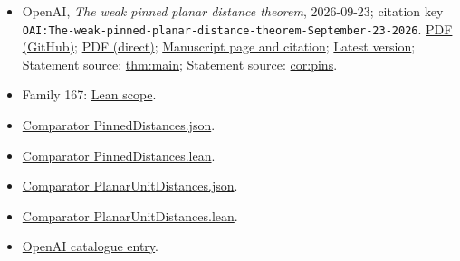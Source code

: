 \documentclass[11pt]{article}
\begin{document}
\begin{itemize}
\item OpenAI, \emph{The weak pinned planar distance theorem}, 2026-09-23; citation key \texttt{OAI:The-weak-pinned-planar-distance-theorem-September-23-2026}. \href{https://github.com/openai/math/blob/adc7f1241b42e322a6451854ab7e4b4c146bf78a/preprints/The-weak-pinned-planar-distance-theorem-September-23-2026/paper.pdf}{PDF (GitHub)}; \href{https://github.com/openai/math/raw/adc7f1241b42e322a6451854ab7e4b4c146bf78a/preprints/The-weak-pinned-planar-distance-theorem-September-23-2026/paper.pdf}{PDF (direct)}; \href{https://github.com/openai/math/blob/adc7f1241b42e322a6451854ab7e4b4c146bf78a/preprints/The-weak-pinned-planar-distance-theorem-September-23-2026/README.md}{Manuscript page and citation}; \href{https://github.com/openai/math/blob/main/preprints/The-weak-pinned-planar-distance-theorem-September-23-2026/paper.pdf}{Latest version}; Statement source: \href{https://github.com/openai/math/blob/adc7f1241b42e322a6451854ab7e4b4c146bf78a/preprints/The-weak-pinned-planar-distance-theorem-September-23-2026/build/sections/introduction.tex\#L30}{thm:main}; Statement source: \href{https://github.com/openai/math/blob/adc7f1241b42e322a6451854ab7e4b4c146bf78a/preprints/The-weak-pinned-planar-distance-theorem-September-23-2026/build/sections/introduction.tex\#L39}{cor:pins}.
\item Family 167: \href{https://github.com/openai/math/blob/adc7f1241b42e322a6451854ab7e4b4c146bf78a/lean/docs/167.md}{Lean scope}.
\item \href{https://github.com/openai/math/blob/adc7f1241b42e322a6451854ab7e4b4c146bf78a/lean/ComparatorChallenges/PinnedDistances.json}{Comparator PinnedDistances.json}.
\item \href{https://github.com/openai/math/blob/adc7f1241b42e322a6451854ab7e4b4c146bf78a/lean/ComparatorChallenges/PinnedDistances.lean}{Comparator PinnedDistances.lean}.
\item \href{https://github.com/openai/math/blob/adc7f1241b42e322a6451854ab7e4b4c146bf78a/lean/ComparatorChallenges/PlanarUnitDistances.json}{Comparator PlanarUnitDistances.json}.
\item \href{https://github.com/openai/math/blob/adc7f1241b42e322a6451854ab7e4b4c146bf78a/lean/ComparatorChallenges/PlanarUnitDistances.lean}{Comparator PlanarUnitDistances.lean}.
\item \href{https://github.com/openai/math/blob/adc7f1241b42e322a6451854ab7e4b4c146bf78a/CONTENTS.md}{OpenAI catalogue entry}.
\end{itemize}
\end{document}
